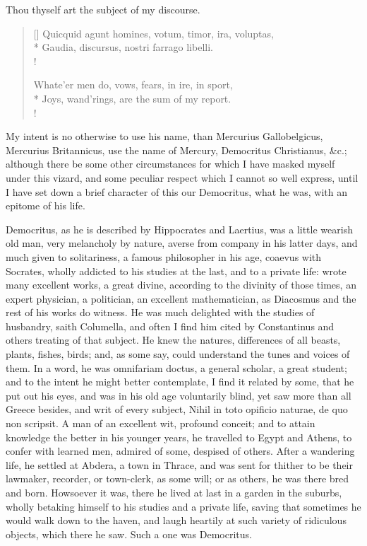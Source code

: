 {Thou thyself art the subject of my discourse.

\settowidth{\versewidth}{Quicquid agunt homines, votum, timor, ira, voluptas,}
\begin{verse}[\versewidth]
Quicquid agunt homines, votum, timor, ira, voluptas,\\*
Gaudia, discursus, nostri farrago libelli.\\!

Whate'er men do, vows, fears, in ire, in sport,\\*
Joys, wand'rings, are the sum of my report.\\!
\end{verse}

My intent is no otherwise to use his name, than Mercurius
Gallobelgicus, Mercurius Britannicus, use the name of Mercury,
Democritus Christianus, \&c.; although there be some other
circumstances for which I have masked myself under this vizard, and
some peculiar respect which I cannot so well express, until I have set
down a brief character of this our Democritus, what he was, with an
epitome of his life.

Democritus, as he is described by Hippocrates and Laertius, was
a little wearish old man, very melancholy by nature, averse from
company in his latter days, and much given to solitariness, a
famous philosopher in his age, coaevus with Socrates, wholly
addicted to his studies at the last, and to a private life: wrote many
excellent works, a great divine, according to the divinity of those
times, an expert physician, a politician, an excellent mathematician,
as Diacosmus and the rest of his works do witness. He was much
delighted with the studies of husbandry, saith Columella, and often
I find him cited by Constantinus and others treating of that
subject. He knew the natures, differences of all beasts, plants,
fishes, birds; and, as some say, could understand the tunes and
voices of them. In a word, he was omnifariam doctus, a general scholar,
a great student; and to the intent he might better contemplate, I
find it related by some, that he put out his eyes, and was in his old
age voluntarily blind, yet saw more than all Greece besides, and 
writ of every subject, Nihil in toto opificio naturae, de quo non
scripsit. A man of an excellent wit, profound conceit; and to
attain knowledge the better in his younger years, he travelled to Egypt
and  Athens, to confer with learned men, admired of some,
despised of others. After a wandering life, he settled at Abdera, a
town in Thrace, and was sent for thither to be their lawmaker,
recorder, or town-clerk, as some will; or as others, he was there bred
and born. Howsoever it was, there he lived at last in a garden in the
suburbs, wholly betaking himself to his studies and a private life,
saving that sometimes he would walk down to the haven, and
laugh heartily at such variety of ridiculous objects, which there he
saw. Such a one was Democritus.

}
